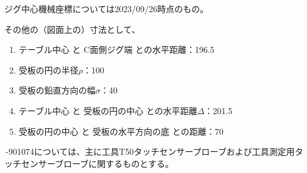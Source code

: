 \begin{marker}
ジグ中心機械座標については2023/09/26時点のもの。
\end{marker}
\clearpage
\begin{hosoku}
その他の（図面上の）寸法として、
\begin{enumerate}
\item テーブル中心 と C面側ジグ端 との水平距離：196.5
\item 受板の円の半径$\rho$：100
\item 受板の鉛直方向の幅$\sigma$：40
\item テーブル中心 と 受板の円の中心 との水平距離$\Delta$：201.5
\item 受板の円の中心 と 受板の水平方向の底 との距離：70
\end{enumerate}
\end{hosoku}



\clearpage
\,-\ttNum901074については、主に工具{\ttfamily T50}タッチセンサープローブおよび工具測定用タッチセンサーブローブに関するものとする。

